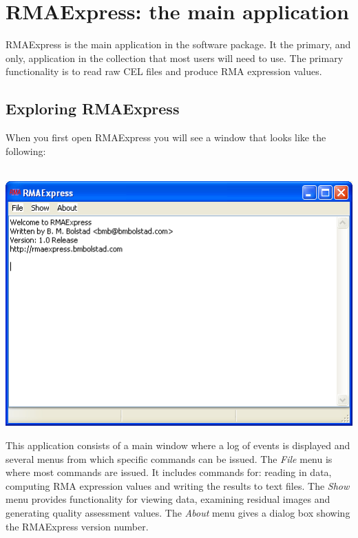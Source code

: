 \documentclass[11pt]{report}
\begin{document}
\chapter{RMAExpress: the main application} \label{chap:RMAExpress}

RMAExpress is the main application in the software package. It the primary, and only, application in the collection that most users will need to use. The primary functionality is to read raw CEL files and produce RMA expression values. 

\section{Exploring RMAExpress}

When you first open RMAExpress you will see a window that looks like the following: \\ \\
\begin{center}
\includegraphics[scale=0.5]{mainwindow}
\end{center}

This application consists of a main window where a log of events is displayed and several menus from which specific commands can be issued. The {\it File} menu is where most commands are issued. It includes commands for: reading in data, computing RMA expression values and writing the results to text files. The {\it Show} menu provides functionality for viewing data, examining residual images and generating quality assessment values. The {\it About} menu gives a dialog box showing the RMAExpress version number.
\end{document}
